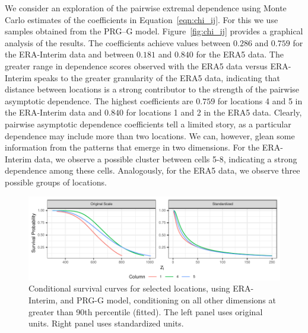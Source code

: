 We consider an exploration of the pairwise extremal dependence using Monte Carlo estimates of the 
  coefficients in  Equation~\eqref{eqn:chi_ij}. For this we use samples obtained from the PRG--G model.
  Figure~\ref{fig:chi_ij} provides a graphical analysis of the results. 
  The coefficients achieve values between $0.286$ and $0.759$ for the ERA-Interim data and 
  between $0.181$ and $0.840$ for the ERA5 data.  The greater range in dependence scores observed 
  with the ERA5 data versus ERA-Interim speaks to the greater granularity of the ERA5 data,
  indicating that distance between locations is a strong contributor to the strength of the 
  pairwise asymptotic dependence. The highest coefficients are $0.759$ for 
  locations 4 and 5 in the ERA-Interim data and
  $0.840$ for locations 1 and 2 in the ERA5 data.  Clearly, pairwise asymptotic
  dependence coefficients tell a limited story, as a particular dependence may include
  more than two locations.   We can, however, glean some information from the patterns that
  emerge in two dimensions.  For the ERA-Interim data, we observe a possible cluster 
  between cells 5-8, indicating a strong dependence among these cells.  Analogously, for
  the ERA5 data, we observe three possible groups of locations.

\begin{figure}[t]
    \centering
    \includegraphics[width=\linewidth]{./images/condsurv_1d}
    \caption{Conditional survival curves for selected locations, using ERA-Interim, and PRG-G model,  conditioning on all other dimensions at greater than 90th percentile (fitted)\label{fig:condsurv1d}. The left panel uses original units. Right panel uses standardized units.}
\end{figure}

